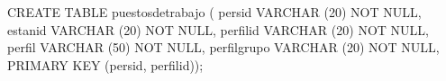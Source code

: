\lstset{caption=Crear tabla ``puestosdetrabajo'',label=sql:crearTablaPuestosdetrabajo}
\begin{SQL}
CREATE TABLE puestosdetrabajo (
persid VARCHAR (20) NOT NULL,
estanid VARCHAR (20) NOT NULL,
perfilid VARCHAR (20) NOT NULL,
perfil VARCHAR (50) NOT NULL,
perfilgrupo VARCHAR (20) NOT NULL,
PRIMARY KEY (persid, perfilid));
\end{SQL}
